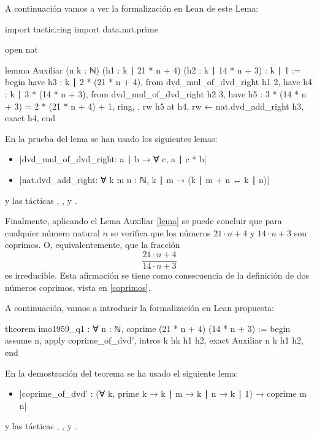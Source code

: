 A continuación vamos a ver la formalización en Lean de este Lema:

\begin{leancode}
import tactic.ring
import data.nat.prime

open nat

lemma Auxiliar
  (n k : ℕ)
  (h1 : k ∣ 21 * n + 4)
  (h2 : k ∣ 14 * n + 3)
  : k ∣ 1 :=
begin
  have h3 : k ∣ 2 * (21 * n + 4),
    from dvd_mul_of_dvd_right h1 2,
  have h4 : k ∣ 3 * (14 * n + 3),
    from dvd_mul_of_dvd_right h2 3,
  have h5 : 3 * (14 * n + 3) = 2 * (21 * n + 4) + 1,
    { ring, },
  rw h5 at h4,
  rw ← nat.dvd_add_right h3,
  exact h4,
end
\end{leancode}

En la prueba del lema se han usado los siguientes lemas:
\begin{itemize}
\item {}|dvd_mul_of_dvd_right: a ∣ b → ∀ c, a ∣ c * b|
\item {}|nat.dvd_add_right: ∀ {k m n : ℕ}, k ∣ m → (k ∣ m + n ↔ k ∣ n)|
\end{itemize}
y las tácticas
,
,
 y
.

Finalmente, aplicando el Lema Auxiliar \ref{lema} se puede concluir que
para cualquier número natural \(n\) se verifica que los números
\(21⋅n+4\) y \(14⋅n+3\) son coprimos. O, equivalentemente, que la
fracción
\begin{equation*}
  \frac{21⋅n+4}{14⋅n+3}
\end{equation*}
es irreducible. Esta afirmación se tiene como consecuencia de la
definición de dos números coprimos, vista en \ref{coprimos}.

A continuación, vamos a introducir la formalización en Lean propuesta:

\begin{leancode}
theorem imo1959_q1 : ∀ n : ℕ, coprime (21 * n + 4) (14 * n + 3) :=
begin
  assume n,
  apply coprime_of_dvd',
  intros k hk h1 h2,
  exact Auxiliar n k h1 h2,
end
\end{leancode}

En la demostración del teorema se ha usado el siguiente lema:
\begin{itemize}
\item {}|coprime_of_dvd' :
  (∀ k, prime k → k ∣ m → k ∣ n → k ∣ 1) → coprime m n|
\end{itemize}
y las tácticas
,
,
 y
.

